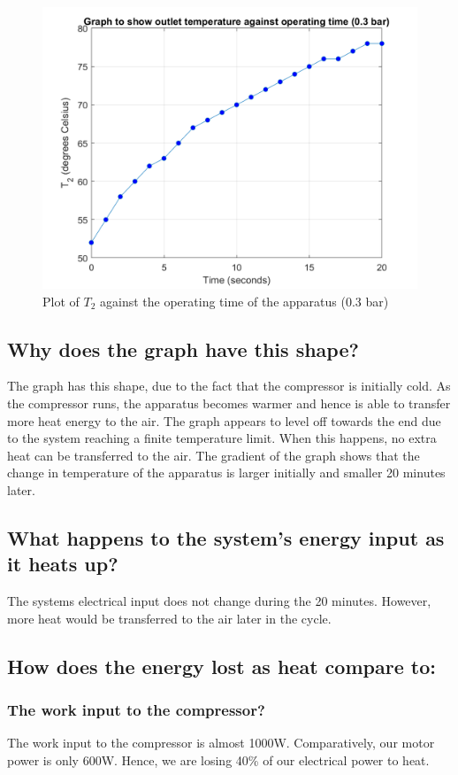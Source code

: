 \documentclass[class=article, crop=false, 12pt,a4paper]{standalone}
\numberwithin{equation}{section}
\begin{document}
\begin{figure}
  \includegraphics[width = 0.9 \textwidth]{./img/T203vsTimeGraph}
  \caption{Plot of \(T_2\) against the operating time of the apparatus (0.3 bar)}
  \label{ref:T203vsTime1bar}
\end{figure}
\subsection{Why does the graph have this shape?}
The graph has this shape, due to the fact that the compressor is initially cold. As the compressor runs, the apparatus becomes warmer and hence is able to transfer more heat energy to the air. The graph appears to level off towards the end due to the system reaching a finite temperature limit. When this happens, no extra heat can be transferred to the air. The gradient of the graph shows that the change in temperature of the apparatus is larger initially and smaller 20 minutes later. 
\subsection{What happens to the system's energy input as it heats up?}
The systems electrical input does not change during the 20 minutes. However, more heat would be transferred to the air later in the cycle. 
\subsection{How does the energy lost as heat compare to:}
\subsubsection{The work input to the compressor?}
The work input to the compressor is almost 1000\si{\watt}. Comparatively, our motor power is only 600\si{\watt}. Hence, we are losing 40\% of our electrical power to heat.
\end{document}

